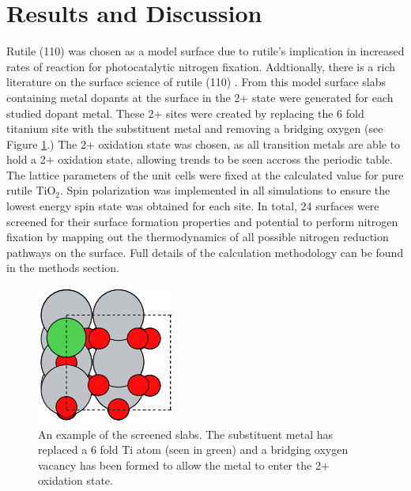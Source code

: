 \section{Results and Discussion}
Rutile (110) was chosen as a model surface due to rutile's implication in increased rates of reaction for photocatalytic nitrogen fixation\cite{Schrauzer_1977}. Addtionally, there is a rich literature on the surface science of rutile (110) \cite{Diebold2003,Yates_1991,Lu1994,Walle2009}. From this model surface slabs containing metal dopants at the surface in the 2+ state were generated for each studied dopant metal. These 2+ sites were created by replacing the 6 fold titanium site with the substituent metal and removing a bridging oxygen (see Figure \ref{fig:ex_slab}.) The 2+ oxidation state was chosen, as all transition metals are able to hold a 2+ oxidation state\cite{Greenwood_chemistry_text_book}, allowing trends to be seen accross the periodic table. The lattice parameters of the unit cells were fixed at the calculated value for pure rutile TiO$_2$. Spin polarization was implemented in all simulations to ensure the lowest energy spin state was obtained for each site. In total, 24 surfaces were screened for their surface formation properties and potential to perform nitrogen fixation by mapping out the thermodynamics of all possible nitrogen reduction pathways on the surface. Full details of the calculation methodology can be found in the methods section.

\begin{figure}
    \centering
    \includegraphics[width=0.5\linewidth]{Images/ex_slab.png}
    \caption{An example of the screened slabs. The substituent metal has replaced a 6 fold Ti atom (seen in green) and a bridging oxygen vacancy has been formed to allow the metal to enter the 2+ oxidation state.}
    \label{fig:ex_slab}
\end{figure}

